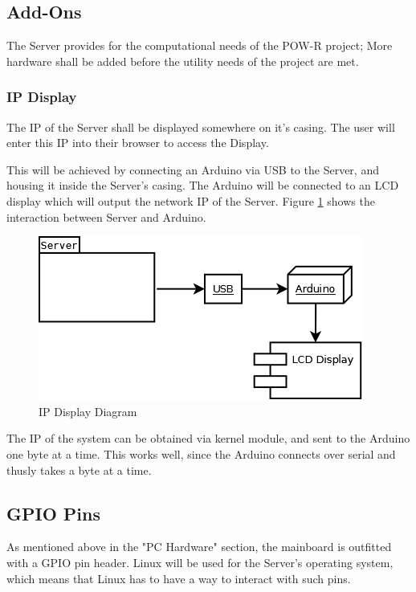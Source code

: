 
\subsection{Add-Ons}
The Server provides for the computational needs of the POW-R project; 
More hardware shall be added before the utility needs of the project are met.

\subsubsection{IP Display}
The IP of the Server shall be displayed somewhere on it's casing. 
The user will enter this IP into their browser to access the Display.

This will be achieved by connecting an Arduino via USB to the Server, and housing it inside the Server's casing. 
The Arduino will be connected to an LCD display which will output the network IP of the Server. 
Figure \ref{ArduinoLCD} shows the interaction between Server and Arduino.

\begin{figure}
\centering
\includegraphics[scale=0.5]{Hardware/images/ArduinoLCD.png}
\caption{IP Display Diagram}
\label{ArduinoLCD}
\end{figure}

The IP of the system can be obtained via kernel module, and sent to the Arduino one byte at a time. 
This works well, since the Arduino connects over serial and thusly takes a byte at a time.

\subsection{GPIO Pins}
As mentioned above in the "PC Hardware" section, the mainboard is outfitted with a GPIO pin header. 
Linux will be used for the Server's operating system, which means that Linux has to have a way to interact with such pins. 

